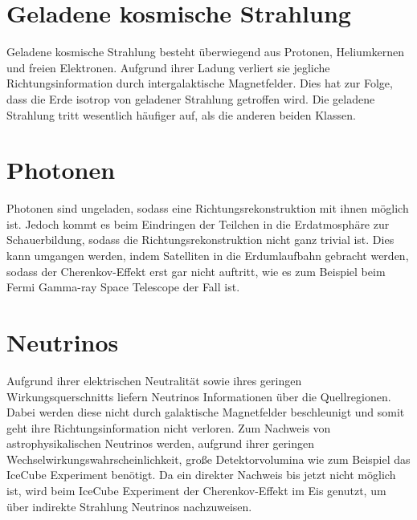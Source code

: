 \section*{Geladene kosmische Strahlung}
Geladene kosmische Strahlung besteht überwiegend aus Protonen, Heliumkernen und freien Elektronen. 
Aufgrund ihrer Ladung verliert sie jegliche Richtungsinformation durch intergalaktische Magnetfelder. 
Dies hat zur Folge, dass die Erde isotrop von geladener Strahlung getroffen wird.
Die geladene Strahlung tritt wesentlich häufiger auf, als die anderen beiden Klassen. 

\section*{Photonen}
Photonen sind ungeladen, sodass eine Richtungsrekonstruktion mit ihnen möglich ist. 
Jedoch kommt es beim Eindringen der Teilchen in die Erdatmosphäre zur Schauerbildung, sodass die Richtungsrekonstruktion nicht ganz trivial ist. 
Dies kann umgangen werden, indem Satelliten in die Erdumlaufbahn gebracht werden, sodass der Cherenkov-Effekt erst gar nicht auftritt, wie es zum Beispiel beim Fermi Gamma-ray Space Telescope der Fall ist.

\section*{Neutrinos}
Aufgrund ihrer elektrischen Neutralität sowie ihres geringen Wirkungsquerschnitts liefern Neutrinos Informationen über die Quellregionen. 
Dabei werden diese nicht durch galaktische Magnetfelder beschleunigt und somit geht ihre Richtungsinformation nicht verloren. 
Zum Nachweis von astrophysikalischen Neutrinos werden, aufgrund ihrer geringen Wechselwirkungswahrscheinlichkeit, große Detektorvolumina wie zum Beispiel das IceCube Experiment benötigt.
Da ein direkter Nachweis bis jetzt nicht möglich ist, wird beim IceCube Experiment der Cherenkov-Effekt im Eis genutzt, um über indirekte Strahlung Neutrinos nachzuweisen.
